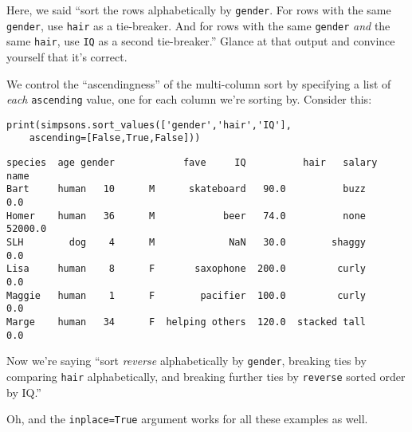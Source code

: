 Here, we said ``sort the rows alphabetically by \texttt{gender}. For rows with
the same \texttt{gender}, use \texttt{hair} as a tie-breaker. And for rows with
the same \texttt{gender} \textit{and} the same \texttt{hair}, use \texttt{IQ}
as a second tie-breaker.'' Glance at that output and convince yourself that
it's correct.

We control the ``ascendingness'' of the multi-column sort by specifying a list
of \textit{each} \texttt{ascending} value, one for each column we're sorting
by. Consider this:

\begin{samepage}
\begin{Verbatim}[fontsize=\small,samepage=true,frame=single,framesep=3mm]
print(simpsons.sort_values(['gender','hair','IQ'],
    ascending=[False,True,False]))
\end{Verbatim}
\vspace{-.2in}

\begin{Verbatim}[fontsize=\small,samepage=true,frame=leftline,framesep=5mm,framerule=1mm]
       species  age gender            fave     IQ          hair   salary
name                                                                    
Bart     human   10      M      skateboard   90.0          buzz      0.0
Homer    human   36      M            beer   74.0          none  52000.0
SLH        dog    4      M             NaN   30.0        shaggy      0.0
Lisa     human    8      F       saxophone  200.0         curly      0.0
Maggie   human    1      F        pacifier  100.0         curly      0.0
Marge    human   34      F  helping others  120.0  stacked tall      0.0
\end{Verbatim}
\end{samepage}

Now we're saying ``sort \textit{reverse} alphabetically by \texttt{gender},
breaking ties by comparing \texttt{hair} alphabetically, and breaking further
ties by \texttt{reverse} sorted order by IQ.''

Oh, and the \texttt{inplace=True} argument works for all these examples as
well.

